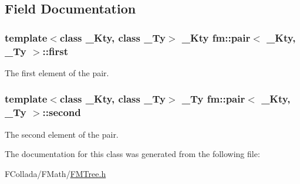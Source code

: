 \subsection{Field Documentation}
\hypertarget{classfm_1_1pair_afc22e37d084f7a4e731a297b72b3efd7}{
\subsubsection[{first}]{\setlength{\rightskip}{0pt plus 5cm}template$<$class \_\-Kty, class \_\-Ty$>$ \_\-Kty {\bf fm::pair}$<$ \_\-Kty, \_\-Ty $>$::{\bf first}}}
\label{classfm_1_1pair_afc22e37d084f7a4e731a297b72b3efd7}
The first element of the pair. \hypertarget{classfm_1_1pair_a80c0b96ba80f34765fd06b0899506977}{
\subsubsection[{second}]{\setlength{\rightskip}{0pt plus 5cm}template$<$class \_\-Kty, class \_\-Ty$>$ \_\-Ty {\bf fm::pair}$<$ \_\-Kty, \_\-Ty $>$::{\bf second}}}
\label{classfm_1_1pair_a80c0b96ba80f34765fd06b0899506977}
The second element of the pair. 

The documentation for this class was generated from the following file:\begin{DoxyCompactItemize}
\item 
FCollada/FMath/\hyperlink{FMTree_8h}{FMTree.h}\end{DoxyCompactItemize}
